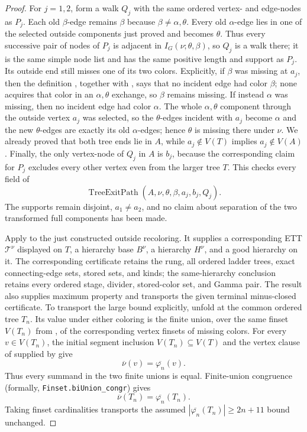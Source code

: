 \begin{proof}
For $j=1,2$, form a walk $Q_j$ with the same ordered vertex- and
edge-nodes as $P_j$.  Each old $\beta$-edge remains $\beta$ because
$\beta\ne\alpha,\theta$.  Every old $\alpha$-edge lies in one of the
selected outside components just proved and becomes $\theta$.  Thus every
successive pair of nodes of $P_j$ is adjacent in
$I_G(\nu;\theta,\beta)$, so $Q_j$ is a walk there; it is the same simple
node list and has the same positive length and support as $P_j$.
Its outside end still misses one of its two colors.  Explicitly, if
$\beta$ was missing at $a_j$, then the definition
, together with , says
that no incident edge had color $\beta$; none acquires that color in an
$\alpha,\theta$ exchange, so $\beta$ remains missing.  If instead
$\alpha$ was missing, then no incident edge had color $\alpha$.  The
whole $\alpha,\theta$ component through the outside vertex $a_j$ was
selected, so the $\theta$-edges incident with $a_j$ become $\alpha$ and
the new $\theta$-edges are exactly its old $\alpha$-edges; hence $\theta$
is missing there under $\nu$.  We already proved that both tree ends lie
in $A$, while $a_j\notin V(T)$ implies $a_j\notin V(A)$.  Finally, the
only vertex-node of $Q_j$ in $A$ is $b_j$, because the corresponding
claim for $P_j$ excludes every other vertex even from the larger tree
$T$.  This checks every field of
\[
       \operatorname{TreeExitPath}(A,\nu,\theta,\beta,a_j,b_j,Q_j).
       \tag{1}
\]
The supports remain disjoint, $a_1\ne a_2$, and no claim about separation
of the two transformed full components has been made.

Apply  to the just constructed outside
recoloring.  It supplies a corresponding ETT $\mathcal T^\nu$ displayed
on $T$, a hierarchy base $B^\nu$, a hierarchy $H^\nu$, and a good
hierarchy on it.  The corresponding certificate retains the rung, all
ordered ladder trees, exact connecting-edge sets, stored sets, and kinds;
the same-hierarchy conclusion retains every ordered stage, divider,
stored-color set, and Gamma pair.  The result also supplies maximum
property and transports the given terminal minus-closed certificate.
To transport the large bound explicitly, unfold
 at the common ordered tree $T_n$.  Its value
under either coloring is the finite union, over the same finset
$V(T_n)$ from , of the corresponding
vertex finsets of missing colors.  For every $v\in V(T_n)$, the initial
segment inclusion $V(T_n)\subseteq V(T)$ and the vertex clause of
 supplied by
 give
\[
             \overline\nu(v)=\overline{\varphi_n}(v).
\]
Thus every summand in the two finite unions is equal.  Finite-union
congruence (formally, \texttt{Finset.biUnion\_congr}) gives
\[
             \overline\nu(T_n)=\overline{\varphi_n}(T_n).
\]
Taking finset cardinalities transports the assumed
$|\overline{\varphi_n}(T_n)|\geq 2n+11$ bound unchanged.


\end{proof}
